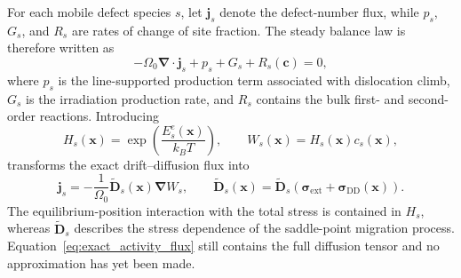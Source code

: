 \documentclass[10pt]{article}
\begin{document}
For each mobile defect species $s$, let $\bm j_s$ denote the defect-number flux,
while $p_s$, $G_s$, and $R_s$ are rates of change of site fraction.  The steady
balance law is therefore written as
\begin{equation}
    -\Omega_0\bm\nabla\cdot\bm j_s
    +p_s+G_s+R_s(\bm c)=0,
    \label{eq:total_species_balance}
\end{equation}
where $p_s$ is the line-supported production term associated with dislocation
climb, $G_s$ is the irradiation production rate, and $R_s$ contains the bulk
first- and second-order reactions.  Introducing
\begin{equation}
    H_s(\bm x)
    =
    \exp\left(\frac{E_s^e(\bm x)}{k_BT}\right),
    \qquad
    W_s(\bm x)=H_s(\bm x)c_s(\bm x),
    \label{eq:activity_definition_theory}
\end{equation}
transforms the exact drift--diffusion flux into
\begin{equation}
    \bm j_s
    =
    -\frac{1}{\Omega_0}
    \widetilde{\bm D}_s(\bm x)\bm\nabla W_s,
    \qquad
    \widetilde{\bm D}_s(\bm x)
    =
    \widetilde{\bm D}_s
    \left(\bm\sigma_{\mathrm{ext}}
    +\bm\sigma_{\mathrm{DD}}(\bm x)\right).
    \label{eq:exact_activity_flux}
\end{equation}
The equilibrium-position interaction with the total stress is contained in
$H_s$, whereas $\widetilde{\bm D}_s$ describes the stress dependence of the
saddle-point migration process.  Equation~\eqref{eq:exact_activity_flux} still
contains the full diffusion tensor and no approximation has yet been made.
\end{document}
